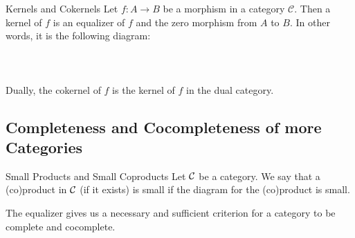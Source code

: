 \documentclass[a4paper]{article}
\begin{document}
\begin{defn}{Kernels and Cokernels}{} Let $f:A\to B$ be a morphism in a category $\mathcal{C}$. Then a kernel of $f$ is an equalizer of $f$ and the zero morphism from $A$ to $B$. In other words, it is the following diagram: \\~\\
\\~\\
Dually, the cokernel of $f$ is the kernel of $f$ in the dual category. 
\end{defn}

\subsection{Completeness and Cocompleteness of more Categories}
\begin{defn}{Small Products and Small Coproducts}{} Let $\mathcal{C}$ be a category. We say that a (co)product in $\mathcal{C}$ (if it exists) is small if the diagram for the (co)product is small. 
\end{defn}

The equalizer gives us a necessary and sufficient criterion for a category to be complete and cocomplete. 
\end{document}

